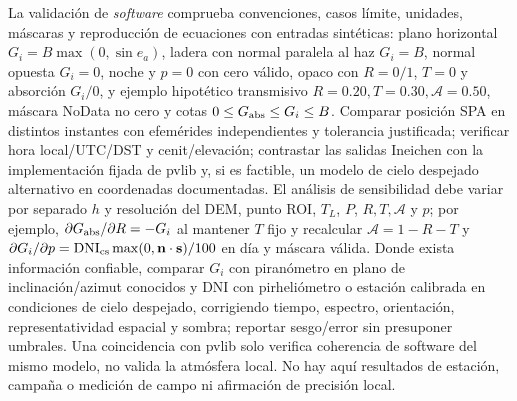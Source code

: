 \documentclass[11pt,a4paper]{article}
\begin{document}
La validación de \emph{software} comprueba convenciones, casos límite, unidades, máscaras y reproducción de ecuaciones con entradas sintéticas: plano horizontal $G_i=B\max(0,\sin e_a)$, ladera con normal paralela al haz $G_i=B$, normal opuesta $G_i=0$, noche y $p=0$ con cero válido, opaco con $R=0/1$, $T=0$ y absorción $G_i/0$, y ejemplo hipotético transmisivo $R=0.20,T=0.30,\mathcal A=0.50$, máscara NoData no cero y cotas $0\leq G_{\rm abs}\leq G_i\leq B$. Comparar posición SPA en distintos instantes con efemérides independientes y tolerancia justificada; verificar hora local/UTC/DST y cenit/elevación; contrastar las salidas Ineichen con la implementación fijada de pvlib y, si es factible, un modelo de cielo despejado alternativo en coordenadas documentadas. El análisis de sensibilidad debe variar por separado $h$ y resolución del DEM, punto ROI, $T_L$, $P$, $R,T,\mathcal A$ y $p$; por ejemplo, $\partial G_{\rm abs}/\partial R=-G_i$ al mantener $T$ fijo y recalcular $\mathcal A=1-R-T$ y $\partial G_i/\partial p=\mathrm{DNI}_{\rm cs}\max(0,\mathbf n\cdot\mathbf s)/100$ en día y máscara válida. Donde exista información confiable, comparar $G_i$ con piranómetro en plano de inclinación/azimut conocidos y DNI con pirheliómetro o estación calibrada en condiciones de cielo despejado, corrigiendo tiempo, espectro, orientación, representatividad espacial y sombra; reportar sesgo/error sin presuponer umbrales. Una coincidencia con pvlib solo verifica coherencia de software del mismo modelo, no valida la atmósfera local. No hay aquí resultados de estación, campaña o medición de campo ni afirmación de precisión local.
\end{document}
